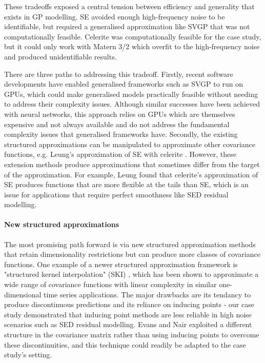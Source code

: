 These tradeoffs exposed a central tension between efficiency and generality that exists in GP modelling. SE avoided enough high-frequency noise to be identifiable, but required a generalised approximation like SVGP that was not computationally feasible. Celerite was computationally feasible for the case study, but it could only work with Matern 3/2 which overfit to the high-frequency noise and produced unidentifiable results.

There are three paths to addressing this tradeoff. Firstly, recent software developments have enabled generalised frameworks such as SVGP to run on GPUs, which could make generalised models practically feasible without needing to address their complexity issues. Although similar successes have been achieved with neural networks, this approach relies on GPUs which are themselves expensive and not always available and do not address the fundamental complexity issues that generalised frameworks have. Secondly, the existing structured approximations can be manipulated to approximate other covariance functions, e.g. Leung's approximation of SE with celerite \cite{galaxy-gp-noise}. However, these extension methods produce approximations that sometimes differ from the target of the approximation. For example, Leung found that celerite's approximation of SE produces functions that are more flexible at the tails than SE, which is an issue for applications that require perfect smoothness like SED residual modelling. 

\paragraph{New structured approximations}
The most promising path forward is via new structured approximation methods that retain dimensionality restrictions but can produce more classes of covariance functions. One example of a newer structured approximation framework is "structured kernel interpolation" (SKI) \cite{ski}, which has been shown to approximate a wide range of covariance functions with linear complexity in similar one-dimensional time series applications. The major drawbacks are its tendancy to produce discontinuous predictions and its reliance on inducing points - our case study demonstrated that inducing point methods are less reliable in high noise scenarios such as SED residual modelling. Evans and Nair \cite{ski-smoother} exploited a different structure in the covariance matrix rather than using inducing points to overcome these discontinuities, and this technique could readily be adapted to the case study's setting.

